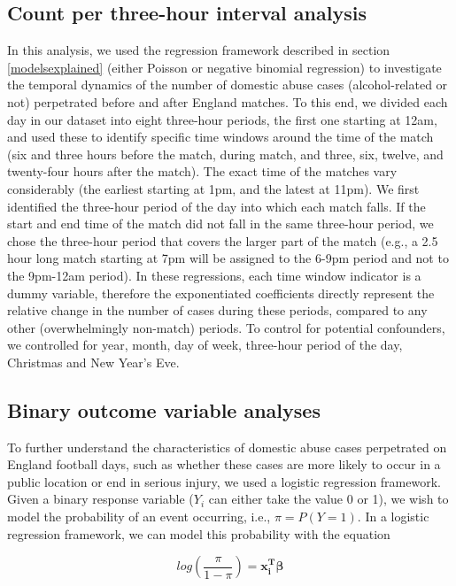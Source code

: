 \documentclass[12pt, a4paper]{article}
\newcommand{\vect}[1]{\boldsymbol{#1}}
\begin{document}
\subsection{Count per three-hour interval analysis}

In this analysis, we used the regression framework described in section \ref{modelsexplained} (either Poisson or negative binomial regression) to investigate the temporal dynamics of the number of domestic abuse cases (alcohol-related or not) perpetrated before and after England matches. To this end, we divided each day in our dataset into eight three-hour periods, the first one starting at 12am, and used these to identify specific time windows around the time of the match (six and three hours before the match, during match, and three, six, twelve, and twenty-four hours after the match). The exact time of the matches vary considerably (the earliest starting at 1pm, and the latest at 11pm). We first identified the three-hour period of the day into which each match falls. If the start and end time of the match did not fall in the same three-hour period, we chose the three-hour period that covers the larger part of the match (e.g., a 2.5 hour long match starting at 7pm will be assigned to the 6-9pm period and not to the 9pm-12am period). In these regressions, each time window indicator is a dummy variable, therefore the exponentiated coefficients directly represent the relative change in the number of cases during these periods, compared to any other (overwhelmingly non-match) periods. To control for potential confounders, we controlled for year, month, day of week, three-hour period of the day, Christmas and New Year's Eve.


\subsection{Binary outcome variable analyses}

To further understand the characteristics of domestic abuse cases perpetrated on England football days, such as whether these cases are more likely to occur in a public location or end in serious injury, we used a logistic regression framework. 
Given a binary response variable ($Y_{i}$ can either take the value 0 or 1), we wish to model the probability of an event occurring, i.e., $\pi = P(Y = 1)$. 
In a logistic regression framework, we can model this probability with the equation

\begin{equation}
log(\frac{\pi}{1-\pi})= \vect{x_i^{T}}\vect{\beta}
\end{equation}
\end{document}
